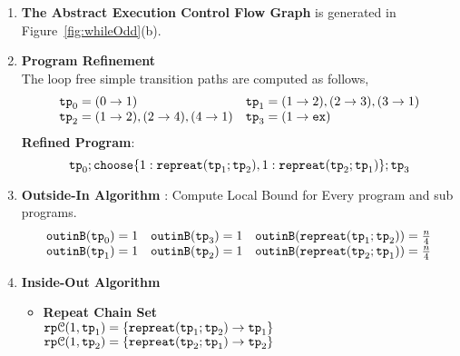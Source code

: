   \begin{enumerate}
    \item  \textbf{The Abstract Execution Control Flow Graph} is generated in Figure~\ref{fig:whileOdd}(b).
    \item \textbf{Program Refinement}
    \\
    The loop free simple transition paths are computed as follows,
    \[
    \begin{array}{ll}
      \mathtt{tp}_0 = (0 \to 1)
      &
      \mathtt{tp}_1 = (1 \to 2), (2 \to 3), (3 \to 1)
      \\
      \mathtt{tp}_2 = (1 \to 2), (2 \to 4), (4 \to 1)
      &
      \mathtt{tp}_3 = (1 \to \mathtt{ex})
    \end{array}
    \]
  \textbf{Refined Program}:
  \[
    \tpath_0 ; \rpchoose{1: \rprepeat(\tpath_1; \tpath_2) , 
    1: \rprepeat(\tpath_2; \tpath_1)}; \tpath_3
    \]
  \item \textbf{Outside-In Algorithm} : Compute Local Bound for Every program and sub programs.
  \[
    \begin{array}{lll}
      \mathtt{outinB}(\mathtt{tp}_0) = 1
      &
      \mathtt{outinB}(\mathtt{tp}_3) = 1
      &
      \mathtt{outinB}(\mathtt{repreat}(\mathtt{tp}_1; \mathtt{tp}_2)) = \frac{n}{4} 
      \\
      \mathtt{outinB}(\mathtt{tp}_1) = 1 
      &
      \mathtt{outinB}(\mathtt{tp}_2) = 1 
      &
      \mathtt{outinB}(\mathtt{repreat}(\mathtt{tp}_2; \mathtt{tp}_1)) = \frac{n}{4}
    \end{array}
    \]
  \item \textbf{Inside-Out Algorithm}
  \begin{itemize}
    \item \textbf{Repeat Chain Set}
    \\
    $\mathtt{rp}\mathcal{C}(1, \mathtt{tp}_1) = \{ \mathtt{repreat}(\mathtt{tp}_1; \mathtt{tp}_2) \to \mathtt{tp}_1\}$ \\
    $\mathtt{rp}\mathcal{C}(1, \mathtt{tp}_2) = \{ \mathtt{repreat}(\mathtt{tp}_2; \mathtt{tp}_1) \to \mathtt{tp}_2\}$ \\

\end{itemize}
\end{enumerate}
